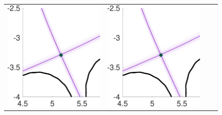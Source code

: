 \documentclass{beamer}
\begin{document}
\begin{frame}[t]
\begin{itemize}[leftmargin=5pt]
\begin{figure}[ht!]
{\begin{tabular}{cccc}
\includegraphics[width=1\linewidth]{QoI_MC_uniform_xptRegion.pdf} 
&\includegraphics[width=1\linewidth]{QoI_MLMC_DirectSolver_xptRegion_Interp2CommonGrid.pdf} 

\end{tabular}}
\end{figure}
\end{itemize}
\end{frame}
\end{document}
